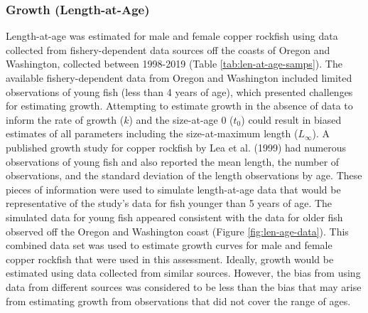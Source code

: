 \documentclass[11pt,
  english,
  a4paper,
]{article}
\begin{document}
\leavevmode\tagmcend\tagstructend\par


\hypertarget{growth-length-at-age}{%
\subsubsection{Growth (Length-at-Age)}\label{growth-length-at-age}}

\leavevmode\tagmcend\tagstructend


Length-at-age was estimated for male and female copper rockfish using data collected from fishery-dependent data sources off the coasts of Oregon and Washington, collected between 1998-2019 (Table \ref{tab:len-at-age-samps}). The available fishery-dependent data from Oregon and Washington included limited observations of young fish (less than 4 years of age), which presented challenges for estimating growth. Attempting to estimate growth in the absence of data to inform the rate of growth ({\(k\)\leavevmode\tagmcend\tagstructend}) and the size-at-age 0 ({\(t_0\)\leavevmode\tagmcend\tagstructend}) could result in biased estimates of all parameters including the size-at-maximum length ({\(L_{\infty}\)\leavevmode\tagmcend\tagstructend}). A published growth study for copper rockfish by Lea et al. {(1999)\leavevmode\tagmcend\tagstructend} had numerous observations of young fish and also reported the mean length, the number of observations, and the standard deviation of the length observations by age. These pieces of information were used to simulate length-at-age data that would be representative of the study's data for fish younger than 5 years of age. The simulated data for young fish appeared consistent with the data for older fish observed off the Oregon and Washington coast (Figure \ref{fig:len-age-data}). This combined data set was used to estimate growth curves for male and female copper rockfish that were used in this assessment. Ideally, growth would be estimated using data collected from similar sources. However, the bias from using data from different sources was considered to be less than the bias that may arise from estimating growth from observations that did not cover the range of ages.
\end{document}
